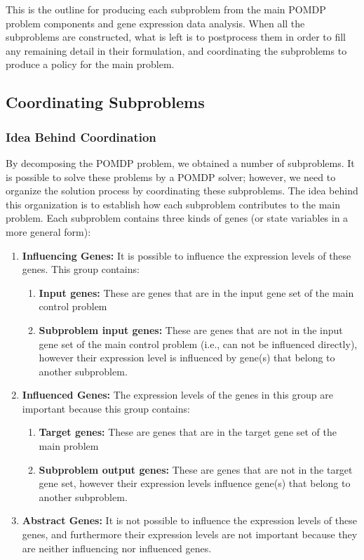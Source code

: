 This is the outline for producing each subproblem from the main POMDP problem components and gene expression
data analysis. When all the subproblems are constructed, what is left is to postprocess them in order to fill
any remaining detail in their formulation, and coordinating the subproblems to produce a policy for the main
problem.

\subsection{Coordinating Subproblems}
\subsubsection{Idea Behind Coordination}
By decomposing the POMDP problem, we obtained a number of subproblems. It is possible to solve these problems
by a POMDP solver; however, we need to organize the solution process by coordinating these subproblems. The
idea behind this organization is to establish how each subproblem contributes to the main problem. Each
subproblem contains three kinds of genes (or state variables in a more general form):

\begin{enumerate}
  \item \textbf{Influencing Genes:} It is possible to influence the expression levels of these genes. This group contains:
  \begin{enumerate}
    \item \textbf{Input genes:} These are genes that are in the input gene set of the main control problem
    \item \textbf{Subproblem input genes:} These are genes that are not in the input gene set of the main control problem
    (i.e., can not be influenced directly), however their expression level is influenced by gene(s) that belong to another subproblem.
  \end{enumerate}
  \item \textbf{Influenced Genes:} The expression levels of the genes in this group are important because this group
  contains:
  \begin{enumerate}
    \item \textbf{Target genes:} These are genes that are in the target gene set of the main problem
    \item \textbf{Subproblem output genes:} These are genes that are not in the target gene set, however their expression
    levels influence gene(s) that belong to another subproblem.
  \end{enumerate}
  \item \textbf{Abstract Genes:} It is not possible to influence the expression levels of these genes, and furthermore
  their expression levels are not important because they are neither influencing nor influenced genes.
\end{enumerate}

